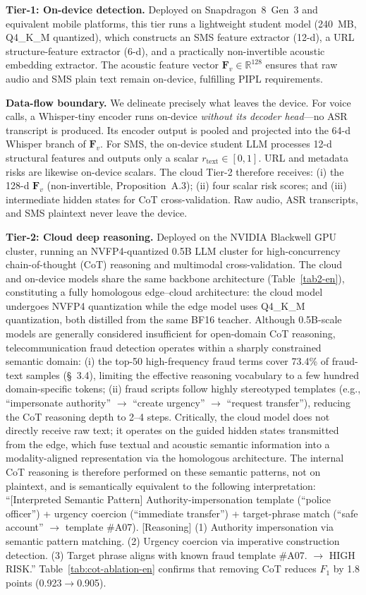 \documentclass[11pt, a4paper]{article}
\begin{document}
\textbf{Tier-1: On-device detection.} Deployed on Snapdragon~8~Gen~3 and equivalent mobile platforms, this tier runs a lightweight student model (240~MB, Q4\_K\_M quantized), which constructs an SMS feature extractor (12-d), a URL structure-feature extractor (6-d), and a practically non-invertible acoustic embedding extractor. The acoustic feature vector $\bm{F}_v\in\mathbb{R}^{128}$ ensures that raw audio and SMS plain text remain on-device, fulfilling PIPL requirements.

\medskip
\noindent\textbf{Data-flow boundary.} We delineate precisely what leaves the device. For voice calls, a Whisper-tiny encoder runs on-device \emph{without its decoder head}---no ASR transcript is produced. Its encoder output is pooled and projected into the 64-d Whisper branch of $\bm{F}_v$. For SMS, the on-device student LLM processes 12-d structural features and outputs only a scalar $r_{\text{text}}\in[0,1]$. URL and metadata risks are likewise on-device scalars. The cloud Tier-2 therefore receives: (i) the 128-d $\bm{F}_v$ (non-invertible, Proposition~A.3); (ii) four scalar risk scores; and (iii) intermediate hidden states for CoT cross-validation. Raw audio, ASR transcripts, and SMS plaintext never leave the device.

\textbf{Tier-2: Cloud deep reasoning.} Deployed on the NVIDIA Blackwell GPU cluster, running an NVFP4-quantized 0.5B LLM cluster for high-concurrency chain-of-thought (CoT) reasoning and multimodal cross-validation. The cloud and on-device models share the same backbone architecture (Table~\ref{tab2-en}), constituting a fully homologous edge--cloud architecture: the cloud model undergoes NVFP4 quantization while the edge model uses Q4\_K\_M quantization, both distilled from the same BF16 teacher. Although 0.5B-scale models are generally considered insufficient for open-domain CoT reasoning, telecommunication fraud detection operates within a sharply constrained semantic domain: (i) the top-50 high-frequency fraud terms cover 73.4\% of fraud-text samples (\S~3.4), limiting the effective reasoning vocabulary to a few hundred domain-specific tokens; (ii) fraud scripts follow highly stereotyped templates (e.g., ``impersonate authority'' $\rightarrow$ ``create urgency'' $\rightarrow$ ``request transfer''), reducing the CoT reasoning depth to 2--4 steps. Critically, the cloud model does not directly receive raw text; it operates on the guided hidden states transmitted from the edge, which fuse textual and acoustic semantic information into a modality-aligned representation via the homologous architecture. The internal CoT reasoning is therefore performed on these semantic patterns, not on plaintext, and is semantically equivalent to the following interpretation: ``[Interpreted Semantic Pattern] Authority-impersonation template (``police officer'') + urgency coercion (``immediate transfer'') + target-phrase match (``safe account'' $\rightarrow$ template \#A07).
[Reasoning] (1) Authority impersonation via semantic pattern matching. (2) Urgency coercion via imperative construction detection. (3) Target phrase aligns with known fraud template \#A07. $\rightarrow$ HIGH RISK.'' Table~\ref{tab:cot-ablation-en} confirms that removing CoT reduces $F_1$ by 1.8 points (0.923$\rightarrow$0.905).
\end{document}
